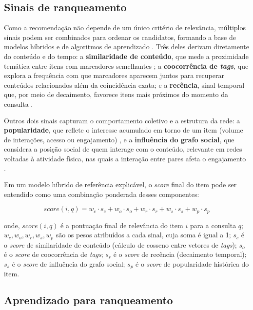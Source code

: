 \documentclass[a4paper,12pt]{article}
\begin{document}
\subsection{Sinais de ranqueamento}

Como a recomendação não depende de um único critério de relevância, múltiplos sinais podem ser combinados para ordenar os candidatos, formando a base de modelos híbridos e de algoritmos de aprendizado \cite{10.1145/3285029}. Três deles derivam diretamente do conteúdo e do tempo: a \textbf{similaridade de conteúdo}, que mede a proximidade temática entre itens com marcadores semelhantes \cite{Lops2011CB}; a \textbf{coocorrência de \textit{tags}}, que explora a frequência com que marcadores aparecem juntos para recuperar conteúdos relacionados além da coincidência exata; e a \textbf{recência}, sinal temporal que, por meio de decaimento, favorece itens mais próximos do momento da consulta \cite{Koren2009Temporal}.

Outros dois sinais capturam o comportamento coletivo e a estrutura da rede: a \textbf{popularidade}, que reflete o interesse acumulado em torno de um item (volume de interações, acesso ou engajamento) \cite{Covington2016YouTube}, e a \textbf{influência do grafo social}, que considera a posição social de quem interage com o conteúdo, relevante em redes voltadas à atividade física, nas quais a interação entre pares afeta o engajamento \cite{Franken2023}.

Em um modelo híbrido de referência explicável, o \textit{score} final do item pode ser entendido como uma combinação ponderada desses componentes:


\begin{equation}
\label{eq:score_hibrido}
score(i,q) = w_c \cdot s_{c} + w_o \cdot s_{o} + w_r \cdot s_{r} + w_s \cdot s_{s} + w_p \cdot s_{p}
\end{equation}

\noindent onde, $score(i,q)$ é a pontuação final de relevância do item $i$ para a consulta $q$; $w_c, w_o, w_r, w_s, w_p$ são os pesos atribuídos a cada sinal, cuja soma é igual a 1; $s_{c}$ é o \textit{score} de similaridade de conteúdo (cálculo de cosseno entre vetores de \textit{tags}); $s_{o}$ é o \textit{score} de coocorrência de \textit{tags}; $s_{r}$ é o \textit{score} de recência (decaimento temporal); $s_{s}$ é o \textit{score} de influência do grafo social; $s_{p}$ é o \textit{score} de popularidade histórica do item.

\subsection{Aprendizado para ranqueamento}
\end{document}
